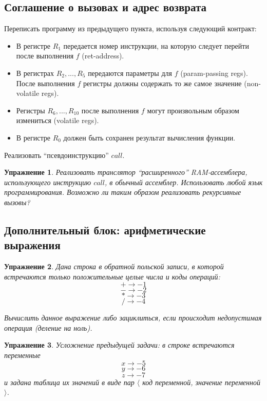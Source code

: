 \documentclass[a4paper, 12pt]{extarticle}
\newtheorem*{homework}{Упражнение}
\begin{document}
\subsection*{Соглашение о вызовах и адрес возврата}
Переписать программу из предыдущего пункта, используя следующий контракт:
\begin{itemize}
 \item В регистре $R_1$ передается номер инструкции, на которую следует перейти после выполнения $f$ (ret-address).
 \item В регистрах $R_2, ..., R_5$ передаются параметры для $f$ (param-passing regs). После выполнения $f$ регистры должны содержать то же самое значение (non-volatile regs).
 \item Регистры $R_6, ..., R_{10}$ после выполнения $f$ могут произвольным образом измениться (volatile regs).
 \item В регистре $R_0$ должен быть сохранен результат вычисления функции.
\end{itemize}

Реализовать ``псевдоинструкцию'' $call$.

\begin{homework}
 Реализовать транслятор ``расширенного'' RAM-ассемблера, использующего инструкцию $call$, в обычный ассемблер.
 Использовать любой язык программирования. Возможно ли таким образом реализовать рекурсивные вызовы?
\end{homework}

\subsection*{Дополнительный блок: арифметические выражения}
\begin{homework}
 Дана строка в обратной польской записи, в которой встречаются только положительные целые числа и коды операций:
 $$+ \rightarrow -1$$
 $$- \rightarrow -2$$
 $$* \rightarrow -3$$
 $$/ \rightarrow -4$$
 
 Вычислить данное выражение либо зациклиться, если происходит недопустимая операция (деление на ноль).
\end{homework}

\begin{homework} 
 Усложнение предыдущей задачи: в строке встречаются переменные
 $$x \rightarrow -5$$
 $$y \rightarrow -6$$
 $$z \rightarrow -7$$
 и задана таблица их значений в виде пар $\langle$ код переменной, значение переменной $\rangle$.
\end{homework}
\end{document}
